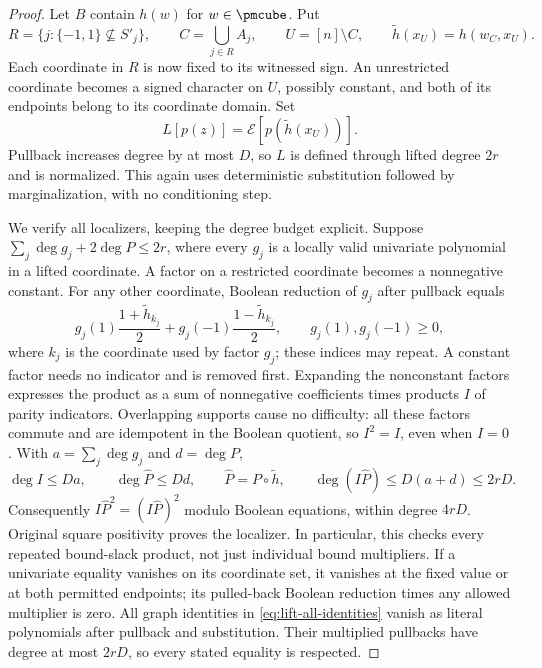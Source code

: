 \begin{proof}
Let $B$ contain $h(w)$ for $w\in\pmcube$. Put
\begin{equation}\label{eq:lift-restricted-supports}
 R=\{j:\{-1,1\}\not\subseteq S'_j\},\qquad
 C=\bigcup_{j\in R}A_j,\qquad U=[n]\setminus C,
 \qquad \widetilde h(x_U)=h(w_C,x_U).
\end{equation}
Each coordinate in $R$ is now fixed to its witnessed sign. An unrestricted
coordinate becomes a signed character on $U$, possibly constant, and both
of its endpoints belong to its coordinate domain. Set
\begin{equation}\label{eq:lift-node-functional}
 L[p(z)]=\mathcal E[p(\widetilde h(x_U))].
\end{equation}
Pullback increases degree by at most $D$, so $L$ is defined through
lifted degree $2r$ and is normalized. This again uses deterministic
substitution followed by marginalization, with no conditioning step.

We verify all localizers, keeping the degree budget explicit. Suppose
$\sum_j\deg g_j+2\deg P\le2r$, where every $g_j$ is a locally valid
univariate polynomial in a lifted coordinate. A factor on a restricted
coordinate becomes a nonnegative constant. For any other coordinate,
Boolean reduction of $g_j$ after pullback equals
\[
 g_j(1)\frac{1+\widetilde h_{k_j}}{2}
 +g_j(-1)\frac{1-\widetilde h_{k_j}}{2},
 \qquad g_j(1),g_j(-1)\ge0,
\]
where $k_j$ is the coordinate used by factor $g_j$; these indices may
repeat. A constant factor needs no indicator and is removed first. Expanding the
nonconstant factors expresses the product as a sum of nonnegative
coefficients times products $I$ of parity indicators. Overlapping supports
cause no difficulty: all these factors commute and are idempotent in the
Boolean quotient, so $I^2=I$, even when $I=0$. With
$a=\sum_j\deg g_j$ and $d=\deg P$,
\begin{equation}\label{eq:lift-degree-accounting}
 \deg I\le Da,\qquad \deg\widehat P\le Dd,
 \qquad\widehat P=P\circ\widetilde h,
 \qquad\deg(I\widehat P)\le D(a+d)\le2rD.
\end{equation}
Consequently $I\widehat P^2=(I\widehat P)^2$ modulo Boolean equations,
within degree $4rD$. Original square positivity proves the localizer.
In particular, this checks every repeated bound-slack product, not just
individual bound multipliers. If a univariate equality vanishes on its
coordinate set, it vanishes at the fixed value or at both permitted
endpoints; its pulled-back Boolean reduction times any allowed multiplier
is zero. All graph identities in \eqref{eq:lift-all-identities} vanish
as literal polynomials after pullback and substitution. Their multiplied
pullbacks have degree at most $2rD$, so every stated equality is respected.


\end{proof}
